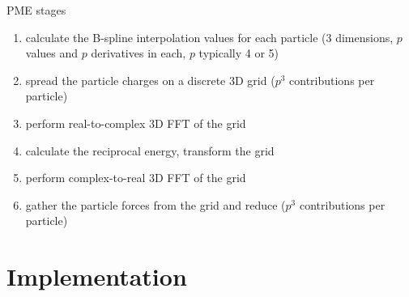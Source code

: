 \documentclass[11pt]{beamer}
\begin{document}
\begin{frame}{PME stages}
\begin{enumerate}
\item calculate the B-spline interpolation values for each particle
(3 dimensions, $p$ values and $p$ derivatives in each, $p$ typically 4 or 5)
\item spread the particle charges on a discrete 3D grid ($p^3$ contributions per particle)
\item perform real-to-complex 3D FFT of the grid
\item calculate the reciprocal energy, transform the grid
\item perform complex-to-real 3D FFT of the grid
\item gather the particle forces from the grid and reduce ($p^3$ contributions per particle)
\end{enumerate}
\end{frame}


\section{Implementation}

%
\end{document}
